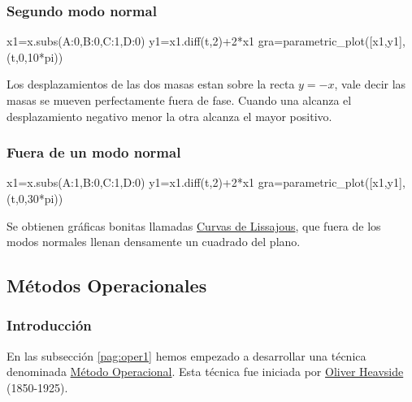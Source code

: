 \documentclass{article}
\begin{document}
 \begin{center}

 \end{center}



\subsubsection{Segundo modo normal}

\begin{sageblock}
  x1=x.subs({A:0,B:0,C:1,D:0})
  y1=x1.diff(t,2)+2*x1
  gra=parametric_plot([x1,y1],(t,0,10*pi))
\end{sageblock}

\begin{center}
\end{center}
Los desplazamientos de las dos masas estan sobre la recta $y=-x$, vale decir las masas se mueven perfectamente fuera de fase. Cuando una alcanza el desplazamiento negativo menor la otra alcanza el mayor positivo.


 \begin{center}
 \end{center}



\subsubsection{Fuera de un modo normal}

\begin{sageblock}
  x1=x.subs({A:1,B:0,C:1,D:0})
  y1=x1.diff(t,2)+2*x1
  gra=parametric_plot([x1,y1],(t,0,30*pi))
\end{sageblock}
\begin{center}
\end{center}
 Se obtienen gráficas  bonitas llamadas \href{http://es.wikipedia.org/wiki/Curva_de_Lissajous}{Curvas de Lissajous}, que fuera de los modos normales llenan densamente un cuadrado del plano.




\subsection{Métodos Operacionales}
\subsubsection{Introducción}
En las subsección \ref{pag:oper1} hemos empezado a desarrollar una técnica denominada \href{http://en.wikipedia.org/wiki/Operational_calculus}{Método Operacional}. Esta técnica fue iniciada por \href{http://es.wikipedia.org/wiki/Oliver_Heaviside}{Oliver Heavside} (1850-1925).
\end{document}
